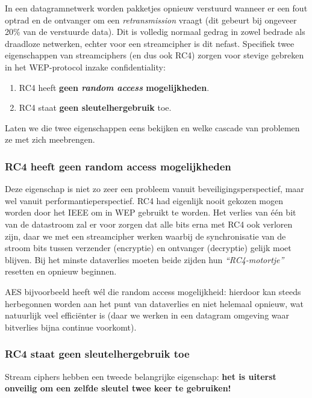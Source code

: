 \documentclass[
  10pt,
  dutch,
  paper=a4,
  ,captions=tableheading
]{scrbook}
\providecommand{\tightlist}{%
  \setlength{\itemsep}{0pt}\setlength{\parskip}{0pt}}
\begin{document}
In een datagramnetwerk worden pakketjes opnieuw verstuurd wanneer er een
fout optrad en de ontvanger om een \emph{retransmission} vraagt (dit
gebeurt bij ongeveer 20\% van de verstuurde data). Dit is volledig
normaal gedrag in zowel bedrade als draadloze netwerken, echter voor een
streamcipher is dit nefast. Specifiek twee eigenschappen van
streamciphers (en dus ook RC4) zorgen voor stevige gebreken in het
WEP-protocol inzake confidentiality:

\begin{enumerate}
\def\labelenumi{\arabic{enumi}.}
\tightlist
\item
  RC4 heeft \textbf{geen \emph{random access} mogelijkheden}.
\item
  RC4 staat \textbf{geen sleutelhergebruik} toe.
\end{enumerate}

Laten we die twee eigenschappen eens bekijken en welke cascade van
problemen ze met zich meebrengen.

\subsubsection{RC4 heeft geen random access
mogelijkheden}\label{rc4-heeft-geen-random-access-mogelijkheden}

Deze eigenschap is niet zo zeer een probleem vanuit
beveiligingsperspectief, maar wel vanuit performantieperspectief. RC4
had eigenlijk nooit gekozen mogen worden door het IEEE om in WEP
gebruikt te worden. Het verlies van één bit van de datastroom zal er
voor zorgen dat alle bits erna met RC4 ook verloren zijn, daar we met
een streamcipher werken waarbij de synchronisatie van de stroom bits
tussen verzender (encryptie) en ontvanger (decryptie) gelijk moet
blijven. Bij het minste dataverlies moeten beide zijden hun
\emph{``RC4-motortje''} resetten en opnieuw beginnen.

AES bijvoorbeeld heeft wél die random access mogelijkheid: hierdoor kan
steeds herbegonnen worden aan het punt van dataverlies en niet helemaal
opnieuw, wat natuurlijk veel efficiënter is (daar we werken in een
datagram omgeving waar bitverlies bijna continue voorkomt).

\subsubsection{RC4 staat geen sleutelhergebruik
toe}\label{rc4-staat-geen-sleutelhergebruik-toe}

Stream ciphers hebben een tweede belangrijke eigenschap: \textbf{het is
uiterst onveilig om een zelfde sleutel twee keer te gebruiken!}
\end{document}
